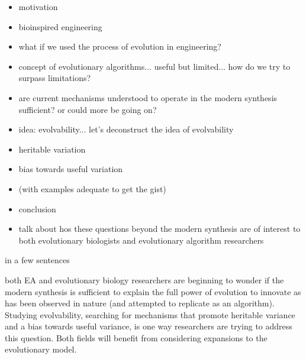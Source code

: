 \begin{itemize}
\item motivation
\item bioinspired engineering
\item what if we used the process of evolution in engineering?
\item concept of evolutionary algorithms... useful but limited... how do we try to surpass limitations?
\item are current mechanisms understood to operate in the modern synthesis sufficient? or could more be going on?
\item idea: evolvability... let's deconstruct the idea of evolvability
\item heritable variation
\item bias towards useful variation
\item (with examples adequate to get the gist)
\item conclusion
\item talk about hos these questions beyond the modern synthesis are of interest to both evolutionary biologists and evolutionary algorithm researchers
\end{itemize}

in a few sentences

both EA and evolutionary biology researchers are beginning to wonder if the modern synthesis is sufficient to explain the full power of evolution to innovate as has been observed in nature (and attempted to replicate as an algorithm). Studying evolvability, searching for mechanisms that promote heritable variance and a bias towards useful variance, is one way researchers are trying to address this question. Both fields will benefit from considering expansions to the evolutionary model.